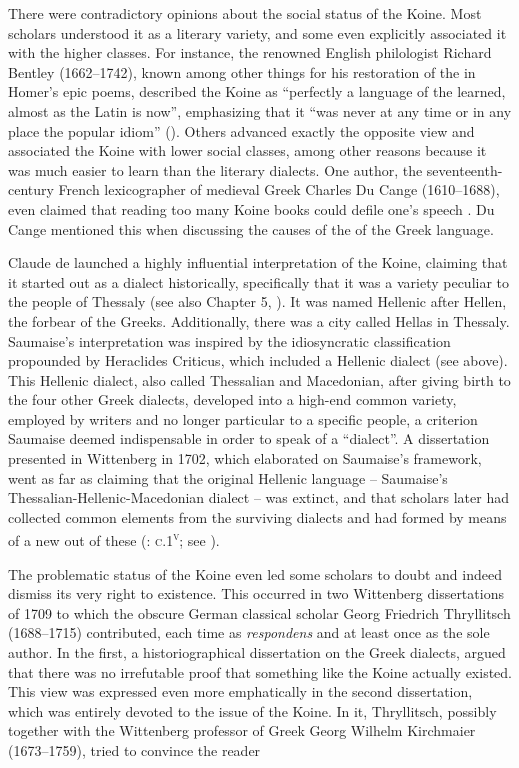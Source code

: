 There were contradictory opinions about the social status of the Koine. Most scholars understood it as a literary variety, and some even explicitly associated it with the higher classes. For instance, the renowned English philologist Richard Bentley (1662–1742), known among other things for his restoration of the  in Homer’s epic poems, described the Koine as “perfectly a language of the learned, almost as the Latin is now”, emphasizing that it “was never at any time or in any place the popular idiom” (\citeyear[406]{Bentley1699}). Others advanced exactly the opposite view and associated the Koine with lower social classes, among other reasons because it was much easier to learn than the literary dialects. One author, the seventeenth-century French lexicographer of medieval Greek Charles Du Cange (1610–1688), even claimed that reading too many Koine books could defile one’s speech \citep[iv]{Du1688}. Du Cange mentioned this when discussing the causes of the  of the Greek language.

Claude de \citet[esp. 405--406]{Saumaise1643a} launched a highly influential interpretation of the Koine, claiming that it started out as a dialect historically, specifically that it was a variety peculiar to the people of Thessaly (see also Chapter 5, ). It was named Hellenic after Hellen, the forbear of the Greeks. Additionally, there was a city called Hellas in Thessaly. Saumaise's interpretation was inspired by the idiosyncratic classification propounded by Heraclides Criticus, which included a Hellenic dialect (see  above). This Hellenic dialect, also called Thessalian and Macedonian, after giving birth to the four other Greek dialects, developed into a high-end common variety, employed by writers and no longer particular to a specific people, a criterion Saumaise deemed indispensable in order to speak of a “dialect”. A dissertation presented in Wittenberg in 1702, which elaborated on Saumaise’s framework, went as far as claiming that the original Hellenic language – Saumaise’s Thessalian-Hellenic-Macedonian dialect – was extinct, and that scholars later had collected common elements from the surviving dialects and had formed by means of  a new  out of these (\citealt{Schwartz1702}: \textsc{c}.1\textsc{\textsuperscript{v}}; see \citet[]{VanRooyFce}).

The problematic status of the Koine even led some scholars to doubt and indeed dismiss its very right to existence. This occurred in two Wittenberg dissertations of 1709 to which the obscure German classical scholar Georg Friedrich Thryllitsch (1688–1715) contributed, each time as \textit{respondens} and at least once as the sole author. In the first, a historiographical dissertation on the Greek dialects, \citet[\textsc{d.1}\textsc{\textsuperscript{v}}]{Thryllitsch1709} argued that there was no irrefutable proof that something like the Koine actually existed. This view was expressed even more emphatically in the second dissertation, which was entirely devoted to the issue of the Koine. In it, Thryllitsch, possibly together with the Wittenberg professor of Greek Georg Wilhelm Kirchmaier (1673–1759), tried to convince the reader

